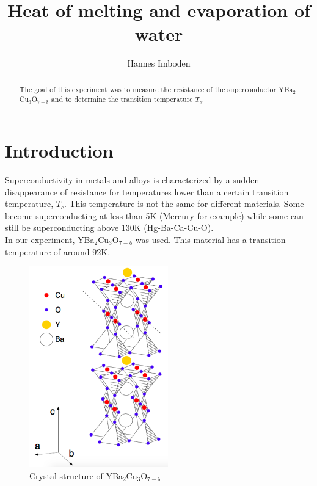 \documentclass[10pt]{article}
\title{Heat of melting and evaporation of water}
\author{Hannes Imboden}
\begin{document}
\begin{abstract}
\noindent
The goal of this experiment was to measure the resistance of the superconductor YBa$_2$Cu$_3$O$_{7-\mathrm{\delta}}$ and to determine the transition temperature $T_c$.
\end{abstract}


\section{Introduction}
Superconductivity in metals and alloys is characterized by a sudden disappearance of resistance for temperatures lower than a certain transition temperature, $T_c$. This temperature is not the same for different materials. Some become superconducting at less than 5K (Mercury for example) while some can still be superconducting above 130K (Hg-Ba-Ca-Cu-O). \\
In our experiment, YBa$_2$Cu$_3$O$_{7-\mathrm{\delta}}$ was used. This material has a transition temperature of around 92K.

\begin{figure}[H]
\centering
\includegraphics[width=6cm]{supercond.png}
\caption{Crystal structure of YBa$_2$Cu$_3$O$_{7-\mathrm{\delta}}$}
\end{figure}
\end{document}
